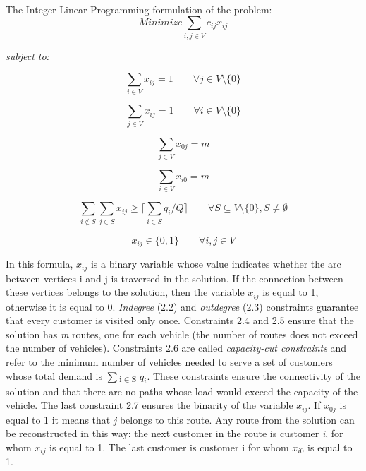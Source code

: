 \documentclass[a4paper,twoside,12pt]{book}
\begin{document}
\paragraph{}
The Integer Linear Programming formulation of the problem:\cite{bib:book:TothAndVigo}
\begin{equation}
Minimize \sum_{i,j \in V} c_{ij}x_{ij}
\end{equation}

\textit{subject to:}

\begin{equation}
\sum_{i \in V}x_{ij} = 1 \qquad \forall j \in V \setminus \lbrace 0 \rbrace
\end{equation}

\begin{equation}
\sum_{j \in V}x_{ij} = 1 \qquad \forall i \in V \setminus \lbrace 0 \rbrace
\end{equation}

\begin{equation}
\sum_{j \in V}x_{0j} = m 
\end{equation}

\begin{equation}
\sum_{i \in V}x_{i0} = m 
\end{equation}

\begin{equation}
\sum_{i \not\in S} \sum_{j \in S}x_{ij} \geq \lceil \sum_{i \in S} q_{i} / Q \rceil \qquad \forall S \subseteq V \setminus \lbrace 0 \rbrace , S \neq \emptyset
\end{equation}

\begin{equation}
x_{ij} \in \lbrace 0,1 \rbrace \qquad \forall i,j \in V
\end{equation}

In this formula, $x_{ij}$  is a binary variable whose value indicates whether the arc between vertices i and j is traversed in the solution.  
If the connection between these vertices belongs to the solution, then the variable $x_{ij}$ is equal to 1, otherwise it is equal to 0. \textit{Indegree} (2.2) and \textit{outdegree} (2.3) constraints guarantee that every customer is visited only once. Constraints 2.4 and 2.5 ensure that the solution has \textit{m} routes, one for each vehicle (the number of routes does not exceed the number of vehicles).
Constraints 2.6 are called \textit{capacity-cut constraints} and refer to the minimum number of vehicles needed to serve a set of customers whose total demand is $\sum$\textsubscript{i$\in$S} $q_{i}$. These constraints ensure the connectivity of the solution and that there are no paths whose load would exceed the capacity of the vehicle. The last constraint 2.7 ensures the binarity of the variable $x_{ij}$. If $x_{0j}$ is equal to 1 it means that \textit{j} belongs to this route. Any route from the solution can be reconstructed in this way: the next customer in the route is customer \textit{i}, for whom $x_{ij}$ is equal to 1. The last customer is customer i for whom $x_{i0}$ is equal to 1. \cite{bib:book:TothAndVigo}
\end{document}
